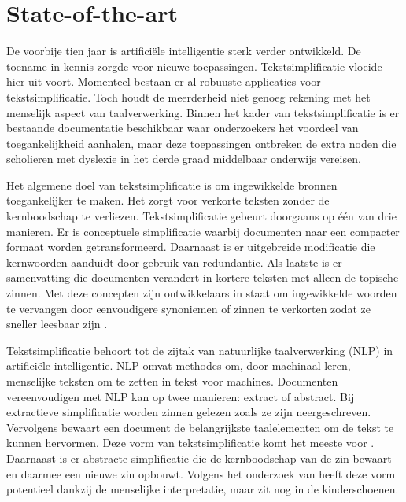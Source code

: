 
\section{State-of-the-art}%
\label{sec:state-of-the-art}

De voorbije tien jaar is artificiële intelligentie sterk verder ontwikkeld. De toename in kennis zorgde voor nieuwe toepassingen. Tekstsimplificatie vloeide hier uit voort. Momenteel bestaan er al robuuste applicaties voor tekstsimplificatie. Toch houdt de meerderheid niet genoeg rekening met het menselijk aspect van taalverwerking. Binnen het kader van tekstsimplificatie is er bestaande documentatie beschikbaar waar onderzoekers het voordeel van toegankelijkheid aanhalen, maar deze toepassingen ontbreken de extra noden die scholieren met dyslexie in het derde graad middelbaar onderwijs vereisen.

Het algemene doel van tekstsimplificatie is om ingewikkelde bronnen toegankelijker te maken. Het zorgt voor verkorte teksten zonder de kernboodschap te verliezen. Tekstsimplificatie \newline gebeurt doorgaans op één van drie manieren. Er is conceptuele simplificatie waarbij documenten naar een compacter formaat worden getransformeerd. Daarnaast is er uitgebreide modificatie die kernwoorden aanduidt door gebruik van redundantie. Als laatste is er samenvatting die documenten verandert in kortere teksten met alleen de topische zinnen. Met deze concepten zijn ontwikkelaars in staat om ingewikkelde woorden te vervangen door eenvoudigere synoniemen of zinnen te verkorten zodat ze sneller leesbaar zijn \autocite{Siddharthan2014}.

Tekstsimplificatie behoort tot de zijtak van natuurlijke taalverwerking (NLP) in artificiële intelligentie. NLP omvat methodes om, door machinaal leren, menselijke teksten om te zetten in tekst voor machines. Documenten vereenvoudigen met NLP kan op twee manieren: extract of abstract. Bij extractieve simplificatie worden zinnen gelezen zoals ze zijn neergeschreven. Vervolgens bewaart een document de belangrijkste taalelementen om de tekst te kunnen hervormen. Deze vorm van tekstsimplificatie komt het meeste voor \autocite{Sciforce2020}. Daarnaast is er abstracte simplificatie die de kernboodschap van de zin bewaart en daarmee een nieuwe zin opbouwt. Volgens het onderzoek van \textcite{Chowdhary2020} heeft deze vorm potentieel dankzij de menselijke interpretatie, maar zit nog in de kinderschoenen.

